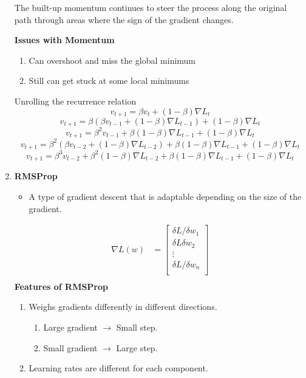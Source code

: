 \begin{enumerate}
\begin{tcolorbox}[title=Numerical Example: Momentum in Action, colback=gray!5, colframe=black!50!gray, width=\textwidth-1cm, center]
The built-up momentum continues to steer the process along the original path through areas where the sign of the gradient changes.
\end{tcolorbox}
    
    \textbf{Issues with Momentum}
    \begin{enumerate}
        \item Can overshoot and miss the global minimum
        \item Still can get stuck at some local minimums
    \end{enumerate}
    Unrolling the recurrence relation
    \[
    v_{t+1} = \beta v_t+(1-\beta)\nabla L_t
    \]
    \[
    v_{t+1} = \beta (\beta v_{t-1} +(1-\beta)\nabla L_{t-1})+(1-\beta)\nabla L_t
    \]
    \[
    v_{t+1}=\beta^2v_{t-1}+\beta(1-\beta)\nabla L_{t-1} +(1-\beta)\nabla L_t
    \]
    \[
    v_{t+1}=\beta^2(\beta v_{t-2}+(1-\beta)\nabla L_{t-2})+\beta(1-\beta)\nabla L_{t-1}+(1-\beta)\nabla L_t
    \]
    \[
    v_{t+1}=\beta^3v_{t-2}+\beta^2(1-\beta)\nabla L_{t-2}+\beta(1-\beta)\nabla L_{t-1}+(1-\beta)\nabla L_t
    \]
    \item \textbf{RMSProp}
    \begin{itemize}
        \item A type of gradient descent that is adaptable depending on the size of the gradient.
    \end{itemize}
    \begin{align*}
    \nabla L(w) &= \begin{bmatrix}
           \delta L/\delta w_1    \\
           \delta L\delta w_2    \\
           \vdots   \\
           \delta L/\delta w_n    \\
         \end{bmatrix} \\
    \end{align*}
    \textbf{Features of RMSProp}
    \begin{enumerate}
        \item Weighs gradients differently in different directions.
        \begin{enumerate}
            \item Large gradient $\rightarrow$ Small step.
            \item Small gradient $\rightarrow$ Large step.
        \end{enumerate}
        \item Learning rates are different for each component.

\end{enumerate}
\end{enumerate}
